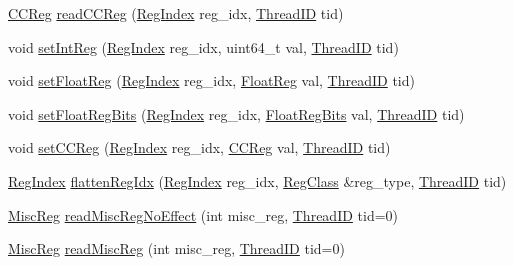 \begin{DoxyCompactItemize}
\item 
\hyperlink{classInOrderCPU_a0c9de550a32808e6a25b54b6c791d5ab}{CCReg} \hyperlink{classInOrderCPU_a958ede16b12c16df2d69b1614381edf1}{readCCReg} (\hyperlink{classInOrderCPU_a36d25e03e43fa3bb4c5482cbefe5e0fb}{RegIndex} reg\_\-idx, \hyperlink{base_2types_8hh_ab39b1a4f9dad884694c7a74ed69e6a6b}{ThreadID} tid)
\item 
void \hyperlink{classInOrderCPU_ae1dce5b4f3b791b6bf420cfba9d5c316}{setIntReg} (\hyperlink{classInOrderCPU_a36d25e03e43fa3bb4c5482cbefe5e0fb}{RegIndex} reg\_\-idx, uint64\_\-t val, \hyperlink{base_2types_8hh_ab39b1a4f9dad884694c7a74ed69e6a6b}{ThreadID} tid)
\item 
void \hyperlink{classInOrderCPU_a60a2b6d8c0ac76cc653e44d1f228e173}{setFloatReg} (\hyperlink{classInOrderCPU_a36d25e03e43fa3bb4c5482cbefe5e0fb}{RegIndex} reg\_\-idx, \hyperlink{classInOrderCPU_a75484259f1855aabc8d74c6eb1cfe186}{FloatReg} val, \hyperlink{base_2types_8hh_ab39b1a4f9dad884694c7a74ed69e6a6b}{ThreadID} tid)
\item 
void \hyperlink{classInOrderCPU_aeb40857aa08ef89112654eb05a7abdec}{setFloatRegBits} (\hyperlink{classInOrderCPU_a36d25e03e43fa3bb4c5482cbefe5e0fb}{RegIndex} reg\_\-idx, \hyperlink{classInOrderCPU_aab5eeae86499f9bfe15ef79360eccc64}{FloatRegBits} val, \hyperlink{base_2types_8hh_ab39b1a4f9dad884694c7a74ed69e6a6b}{ThreadID} tid)
\item 
void \hyperlink{classInOrderCPU_a54f8b635e27b3a845dd71124a4784951}{setCCReg} (\hyperlink{classInOrderCPU_a36d25e03e43fa3bb4c5482cbefe5e0fb}{RegIndex} reg\_\-idx, \hyperlink{classInOrderCPU_a0c9de550a32808e6a25b54b6c791d5ab}{CCReg} val, \hyperlink{base_2types_8hh_ab39b1a4f9dad884694c7a74ed69e6a6b}{ThreadID} tid)
\item 
\hyperlink{classInOrderCPU_a36d25e03e43fa3bb4c5482cbefe5e0fb}{RegIndex} \hyperlink{classInOrderCPU_a4d739dee63b39a75eca478db2f8091bf}{flattenRegIdx} (\hyperlink{classInOrderCPU_a36d25e03e43fa3bb4c5482cbefe5e0fb}{RegIndex} reg\_\-idx, \hyperlink{reg__class_8hh_a3ed1e3c98353f2cc926e9d2b2a527cc0}{RegClass} \&reg\_\-type, \hyperlink{base_2types_8hh_ab39b1a4f9dad884694c7a74ed69e6a6b}{ThreadID} tid)
\item 
\hyperlink{classInOrderCPU_aaf5f073a387db0556d1db4bcc45428bc}{MiscReg} \hyperlink{classInOrderCPU_af2ec8925148a53b9bddefb7fb65a7223}{readMiscRegNoEffect} (int misc\_\-reg, \hyperlink{base_2types_8hh_ab39b1a4f9dad884694c7a74ed69e6a6b}{ThreadID} tid=0)
\item 
\hyperlink{classInOrderCPU_aaf5f073a387db0556d1db4bcc45428bc}{MiscReg} \hyperlink{classInOrderCPU_a71d44ee14eeab530a09bc7d68d97ece2}{readMiscReg} (int misc\_\-reg, \hyperlink{base_2types_8hh_ab39b1a4f9dad884694c7a74ed69e6a6b}{ThreadID} tid=0)

\end{DoxyCompactItemize}
